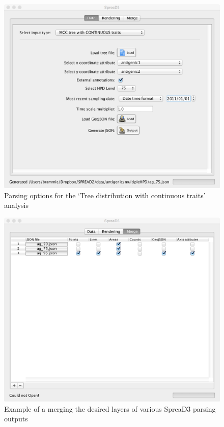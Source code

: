 \documentclass[english]{paper}
\begin{document}
\begin{figure}[!H]
\centering
\includegraphics[width=1\textwidth]{./figures/parseAG.pdf} 
\caption{Parsing options for the `Tree distribution with continuous traits' analysis}
\label{fig:parseTipsTricks}
\end{figure}

\begin{figure}[!H]
\centering
\includegraphics[width=1\textwidth]{./figures/merge_ag.pdf} 
\caption{Example of a merging the desired layers of various SpreaD3 parsing outputs}
\label{fig:mergeTipsTricks}
\end{figure}
\end{document}
